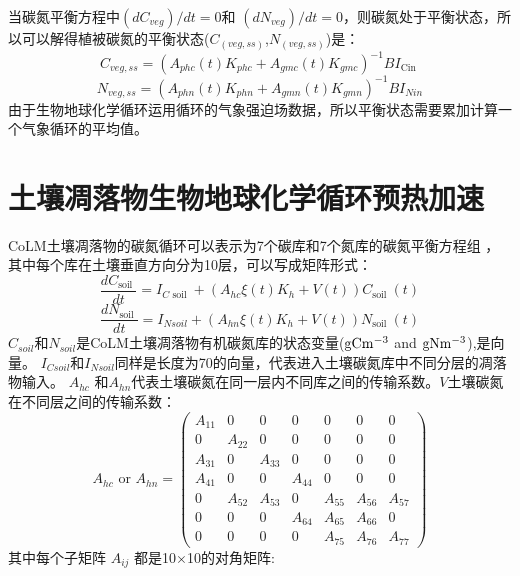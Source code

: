当碳氮平衡方程中$(dC_{veg})/dt=0$和 $(dN_{veg})/dt=0$，则碳氮处于平衡状态，所以可以解得植被碳氮的平衡状态($C_{(veg,ss)}$,$N_{(veg,ss)}$)是：
\begin{equation}
C_{veg, s s}=\left(A_{p h c}(t) K_{p h c}+A_{gmc}(t) K_{gmc}\right)^{-1} B I_{\text {Cin }}
\end{equation}
\begin{equation}
N_{veg, s s}=\left(A_{phn}(t) K_{phn}+A_{gmn}(t) K_{gmn}\right)^{-1} B I_{Nin}
\end{equation}
由于生物地球化学循环运用循环的气象强迫场数据，所以平衡状态需要累加计算一个气象循环的平均值。

\section{土壤凋落物生物地球化学循环预热加速}
CoLM土壤凋落物的碳氮循环可以表示为7个碳库和7个氮库的碳氮平衡方程组 \citep{lu2020full}，其中每个库在土壤垂直方向分为10层，可以写成矩阵形式：
\begin{equation}
\frac{d C_{\text {soil }}}{dt}=I_{C \text { soil }}+\left(A_{h c} \xi(t) K_{h}+V(t)\right) C_{\text {soil }}(t)
\end{equation}
\begin{equation}
\frac{d N_{\text {soil }}}{dt}=I_{N s o i l}+\left(A_{h n} \xi(t) K_{h}+V(t)\right) N_{\text {soil }}(t)
\end{equation}
$C_{soil}$和$N_{soil}$是CoLM土壤凋落物有机碳氮库的状态变量($\rm gC m^{-3}$ and $\rm gN m^{-3}$),是向量。
$I_{Csoil}$和$I_{Nsoil}$同样是长度为70的向量，代表进入土壤碳氮库中不同分层的凋落物输入。
 $A_{hc}$ 和$A_{hn}$代表土壤碳氮在同一层内不同库之间的传输系数。$V$土壤碳氮在不同层之间的传输系数：
\begin{equation}
A_{h c} \text { or } A_{h n}=\left(\begin{array}{ccccccc}
  A_{11} & 0 & 0 & 0 & 0 & 0 & 0 \\ 
  0 & A_{22} & 0 & 0 & 0 & 0 & 0 \\
  A_{31} & 0 & A_{33} & 0 & 0 & 0 & 0 \\
  A_{41} & 0 & 0 & A_{44} & 0 & 0 & 0 \\
  0 & A_{52} & A_{53} & 0 & A_{55} & A_{56} & A_{57} \\
  0 & 0 & 0 & A_{64} & A_{65} & A_{66} & 0 \\ 
  0 & 0 & 0 & 0 & A_{75} & A_{76} & A_{77}\end{array}\right)
\end{equation}
其中每个子矩阵 $A_{ij}$ 都是10$\times$10的对角矩阵:  


